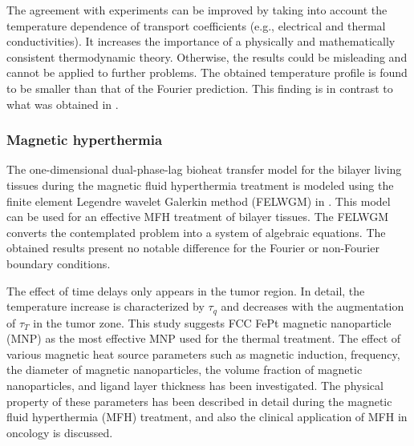 \documentclass[sn-mathphys]{sn-jnl}%
\theoremstyle{thmstyleone}%
\theoremstyle{thmstyletwo}%
\theoremstyle{thmstylethree}%
\begin{document}
{The agreement with experiments can be improved by taking into account the temperature dependence of transport coefficients (e.g., electrical and thermal conductivities). It increases the importance of a physically and mathematically consistent thermodynamic theory. Otherwise, the results could be misleading and cannot be applied to further problems. The obtained temperature profile is found to be smaller than that of the Fourier prediction. This finding is in contrast to what was obtained in \cite{Kumar2016ll,Zhang2017}. 


\subsubsection{Magnetic hyperthermia}
The one-dimensional dual-phase-lag bioheat transfer model for the bilayer living tissues during the magnetic fluid hyperthermia treatment is modeled using the finite element Legendre wavelet Galerkin method (FELWGM) in \cite{Kumar2016ll}. This model can be used for an effective MFH treatment of bilayer tissues. The FELWGM converts the contemplated problem into a system of algebraic equations. The obtained results present no notable difference for the Fourier or non-Fourier boundary conditions.

The effect of time delays only appears in the tumor region. In detail, the temperature increase is characterized by $\tau_q$ and decreases with the augmentation of $\tau_T$ in the tumor zone. This study suggests FCC FePt magnetic nanoparticle (MNP) as the most effective MNP used for the thermal treatment. The effect of various magnetic heat source parameters such as magnetic induction, frequency, the diameter of magnetic nanoparticles, the volume fraction of magnetic nanoparticles, and ligand layer thickness has been investigated. The physical property of these parameters has been described in detail during the magnetic fluid hyperthermia (MFH) treatment, and also the clinical application of MFH in oncology is discussed. 

}
\end{document}
